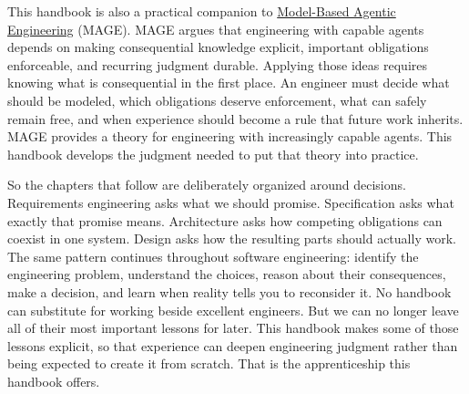 This handbook is also a practical companion to \href{https://davisjam.github.io/model-based-agentic-software-engineering/book/mage-book/index.html}{Model-Based Agentic Engineering} (MAGE). MAGE
argues that engineering with capable agents depends on making consequential knowledge explicit,
important obligations enforceable, and recurring judgment durable. Applying those ideas requires
knowing what is consequential in the first place. An engineer must decide what should be modeled,
which obligations deserve enforcement, what can safely remain free, and when experience should
become a rule that future work inherits. MAGE provides a theory for engineering with increasingly
capable agents. This handbook develops the judgment needed to put that theory into practice.

So the chapters that follow are deliberately organized around decisions. Requirements engineering
asks what we should promise. Specification asks what exactly that promise means. Architecture asks
how competing obligations can coexist in one system. Design asks how the resulting parts should
actually work. The same pattern continues throughout software engineering: identify the engineering
problem, understand the choices, reason about their consequences, make a decision, and learn when
reality tells you to reconsider it. No handbook can substitute for working beside excellent
engineers. But we can no longer leave all of their most important lessons for later. This handbook
makes some of those lessons explicit, so that experience can deepen engineering judgment rather than
being expected to create it from scratch. That is the apprenticeship this handbook offers.
